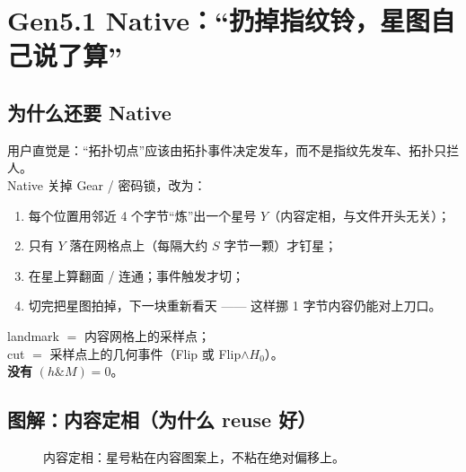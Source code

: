 \chapter{Gen5.1 Native：``扔掉指纹铃，星图自己说了算''}
\label{ch:native-stars}

\section{为什么还要 Native}

用户直觉是：``拓扑切点''应该由拓扑事件决定发车，而不是指纹先发车、拓扑只拦人。\\
Native 关掉 Gear / 密码锁，改为：

\begin{metaphor}[夜空采样]
\begin{enumerate}[nosep]
  \item 每个位置用邻近 4 个字节``炼''出一个星号 $Y$（内容定相，与文件开头无关）；
  \item 只有 $Y$ 落在网格点上（每隔大约 $S$ 字节一颗）才钉星；
  \item 在星上算翻面 / 连通；事件触发才切；
  \item 切完把星图拍掉，下一块重新看天 —— 这样挪 1 字节内容仍能对上刀口。
\end{enumerate}
\end{metaphor}

\begin{keyidea}[Native]
landmark $=$ 内容网格上的采样点；\\
cut $=$ 采样点上的几何事件（Flip 或 Flip$\land H_0$）。\\
\textbf{没有} $(h\&M)=0$。
\end{keyidea}

\section{图解：内容定相（为什么 reuse 好）}

\begin{figure}[htbp]
\centering
{}
\caption{内容定相：星号粘在内容图案上，不粘在绝对偏移上。}
\label{fig:native-embed}
\end{figure}

